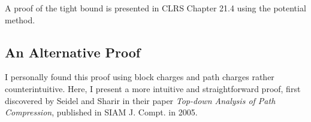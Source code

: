A proof of the tight bound is presented in CLRS Chapter 21.4 using the potential method.

\subsection{An Alternative Proof}

I personally found this proof using block charges and path charges rather counterintuitive. Here, I present a more intuitive and straightforward proof, first discovered by Seidel and Sharir in their paper \textit{Top-down Analysis of Path Compression}, published in SIAM J. Compt. in 2005.